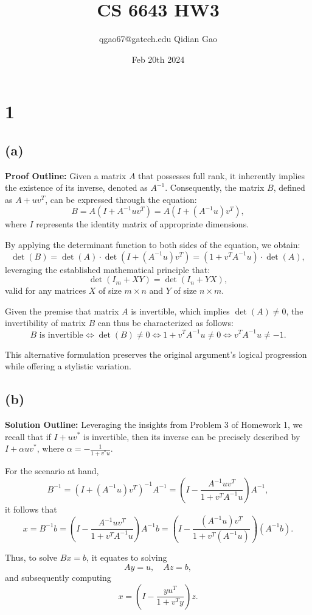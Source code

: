 \documentclass{article}
\title{CS 6643 HW3}
\author{qgao67@gatech.edu Qidian Gao}
\date{Feb 20th 2024}
\begin{document}
\maketitle
\section{1}
\subsection{(a)}
\textbf{Proof Outline:} Given a matrix \(A\) that possesses full rank, it inherently implies the existence of its inverse, denoted as \(A^{-1}\). Consequently, the matrix \(B\), defined as \(A + uv^T\), can be expressed through the equation:
\[
B = A(I + A^{-1}uv^T) = A(I + (A^{-1}u)v^T),
\]
where \(I\) represents the identity matrix of appropriate dimensions.

By applying the determinant function to both sides of the equation, we obtain:
\[
\det(B) = \det(A) \cdot \det(I + (A^{-1}u)v^T) = (1 + v^TA^{-1}u) \cdot \det(A),
\]
leveraging the established mathematical principle that:
\[
\det(I_m + XY) = \det(I_n + YX),
\]
valid for any matrices \(X\) of size \(m \times n\) and \(Y\) of size \(n \times m\).

Given the premise that matrix \(A\) is invertible, which implies \(\det(A) \neq 0\), the invertibility of matrix \(B\) can thus be characterized as follows:
\[
B \text{ is invertible} \iff \det(B) \neq 0 \iff 1 + v^TA^{-1}u \neq 0 \iff v^TA^{-1}u \neq -1.
\]

This alternative formulation preserves the original argument's logical progression while offering a stylistic variation.
\subsection{(b)}
\textbf{Solution Outline:} Leveraging the insights from Problem 3 of Homework 1, we recall that if \(I + uv^*\) is invertible, then its inverse can be precisely described by \(I + \alpha uv^*\), where \(\alpha = -\frac{1}{1 + v^*u}\).

For the scenario at hand,
\[
B^{-1} = \left(I + \left(A^{-1}u\right)v^T\right)^{-1}A^{-1} = \left(I - \frac{A^{-1}uv^T}{1 + v^TA^{-1}u}\right)A^{-1},
\]
it follows that
\[
x = B^{-1}b = \left(I - \frac{A^{-1}uv^T}{1 + v^TA^{-1}u}\right)A^{-1}b = \left(I - \frac{\left(A^{-1}u\right)v^T}{1 + v^T\left(A^{-1}u\right)}\right)\left(A^{-1}b\right).
\]

Thus, to solve \(Bx = b\), it equates to solving
\[
Ay = u, \quad Az = b,
\]
and subsequently computing
\[
x = \left(I - \frac{yu^T}{1 + v^Ty}\right)z.
\]
\end{document}
